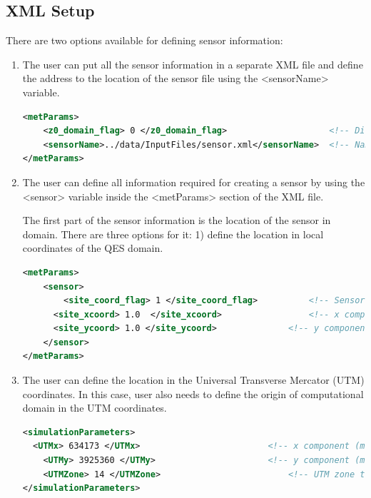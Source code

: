 \subsection{XML Setup}
\label{sec:sensor_xml}

There are two options available for defining sensor information:

\begin{enumerate}

\item The user can put all the sensor information in a separate XML file and define the address to the location of the sensor file using the <sensorName> variable.

\begin{lstlisting}[language=XML]
<metParams>
	<z0_domain_flag> 0 </z0_domain_flag>           			<!-- Distribution of surface roughness for domain (0-uniform (default), 1-custom -->
	<sensorName>../data/InputFiles/sensor.xml</sensorName>	<!-- Name of the sensor file with information for the sensor included -->
</metParams>
\end{lstlisting}
\noindent

\item The user can define all information required for creating a sensor by using the <sensor> variable inside the <metParams> section of the XML file.

The first part of the sensor information is the location of the sensor in domain. There are three options for it: 1) define the location in local coordinates of the QES domain.

\begin{lstlisting}[language=XML]
<metParams>
	<sensor>
	    <site_coord_flag> 1 </site_coord_flag> 			<!-- Sensor site coordinate system (1=QES (default), 2=UTM, 3=Lat/Lon) -->
      <site_xcoord> 1.0  </site_xcoord> 				<!-- x component of site location in QES domain (m) (if site_coord_flag = 1) -->
      <site_ycoord> 1.0 </site_ycoord> 				<!-- y component of site location in QES domain (m) (if site_coord_flag = 1)-->
	</sensor>
</metParams>
\end{lstlisting}
\noindent

\item The user can define the location in the Universal Transverse Mercator (UTM) coordinates. In this case, user also needs to define the origin of computational domain in the UTM coordinates.

\begin{lstlisting}[language=XML]
<simulationParameters>
  <UTMx> 634173 </UTMx> 						<!-- x component (m) of origin in UTM -->
	<UTMy> 3925360 </UTMy> 						<!-- y component (m) of origin in UTM -->
	<UTMZone> 14 </UTMZone> 						<!-- UTM zone that domain located -->
</simulationParameters>
\end{lstlisting}


\end{enumerate}
